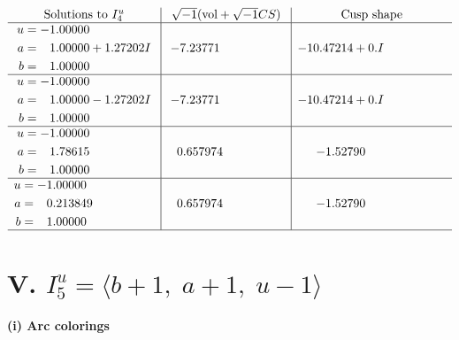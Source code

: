 \documentclass[1p]{elsarticle_modified}
\theoremstyle{definition}
\newcommand{\I}{\sqrt{-1}}
\begin{document}
$$\begin{array}{c|c|c}  
\text{Solutions to }I^u_{4}& \I (\text{vol} + \sqrt{-1}CS) & \text{Cusp shape}\\
 \hline 
\begin{aligned}
u &= -1.00000\phantom{ +0.000000I} \\
a &= \phantom{-}1.00000 + 1.27202 I \\
b &= \phantom{-}1.00000\phantom{ +0.000000I}\end{aligned}
 & -7.23771\phantom{ +0.000000I} & -10.47214 + 0. I\phantom{ +0.000000I} \\ \hline\begin{aligned}
u &= -1.00000\phantom{ +0.000000I} \\
a &= \phantom{-}1.00000 - 1.27202 I \\
b &= \phantom{-}1.00000\phantom{ +0.000000I}\end{aligned}
 & -7.23771\phantom{ +0.000000I} & -10.47214 + 0. I\phantom{ +0.000000I} \\ \hline\begin{aligned}
u &= -1.00000\phantom{ +0.000000I} \\
a &= \phantom{-}1.78615\phantom{ +0.000000I} \\
b &= \phantom{-}1.00000\phantom{ +0.000000I}\end{aligned}
 & \phantom{-}0.657974\phantom{ +0.000000I} & -1.52790\phantom{ +0.000000I} \\ \hline\begin{aligned}
u &= -1.00000\phantom{ +0.000000I} \\
a &= \phantom{-}0.213849\phantom{ +0.000000I} \\
b &= \phantom{-}1.00000\phantom{ +0.000000I}\end{aligned}
 & \phantom{-}0.657974\phantom{ +0.000000I} & -1.52790\phantom{ +0.000000I}\\
 \hline 
 \end{array}$$\newpage\newpage\renewcommand{\arraystretch}{1}
\centering \section*{V. $I^u_{5}= \langle b+1,\;a+1,\;u-1 \rangle$}
\flushleft \textbf{(i) Arc colorings}\\
\end{document}
